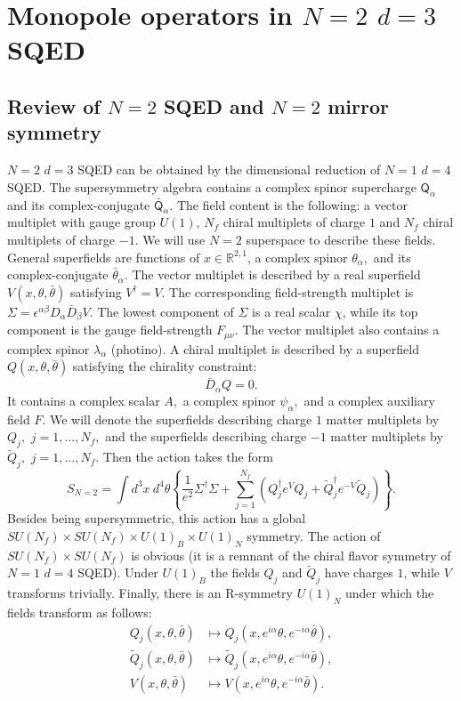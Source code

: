 \documentclass[a4paper,12pt, amsfonts, amssymb]{article}
\newcommand{\RR}{{\mathbb R}}
\newcommand{\eps}{\epsilon}
\newcommand{\tQ}{{\tilde Q}}
\newcommand{\bD}{{\bar D}}
\newcommand{\btheta}{{\bar \theta}}
\newcommand{\Q}{{\mathsf Q}}
\begin{document}
\section{Monopole operators in $N=2$ $d=3$ SQED}\label{sec:ntwo}

\subsection{Review of $N=2$ SQED and $N=2$ mirror symmetry}

$N=2$ $d=3$ SQED can be obtained by the dimensional reduction of $N=1$ $d=4$
SQED. The supersymmetry algebra contains a complex spinor supercharge $\Q_\alpha$ and its complex-conjugate $\bar{\Q}_\alpha$.
The field content is the following: a vector multiplet with gauge
group $U(1)$, $N_f$ chiral multiplets of charge $1$ and $N_f$ chiral multiplets
of charge $-1$. We will use $N=2$ superspace to describe these fields.
General superfields are functions of $x\in\RR^{2,1}$, a complex spinor 
$\theta_\alpha,$ and its complex-conjugate $\btheta_\alpha$. 
The vector multiplet is described
by a real superfield $V(x,\theta,\btheta)$ satisfying $V^\dag=V$. 
The corresponding field-strength multiplet is 
$\Sigma=\eps^{\alpha\beta}D_\alpha \bD_\beta V.$ The lowest component of
$\Sigma$ is a real scalar $\chi$, while its top component is the gauge 
field-strength $F_{\mu\nu}$.
The vector multiplet also contains a complex spinor $\lambda_\alpha$ (photino).
A chiral multiplet is described by a superfield $Q(x,\theta,\btheta)$ 
satisfying the chirality constraint:
$$
\bD_\alpha Q=0.
$$
It contains a complex scalar $A,$ a complex spinor $\psi_\alpha,$ and a
complex auxiliary field $F$.
We will denote the superfields describing charge $1$ matter multiplets 
by $Q_j,$ $j=1,\ldots,N_f,$ and the superfields describing charge $-1$ matter multiplets by $\tQ_j,$ $j=1,\ldots,N_f.$ Then the action takes the
form
$$
S_{N=2}=\int d^3 x\ d^4\theta\left\{\frac{1}{e^2}\Sigma^\dag\Sigma+
\sum_{j=1}^{N_f}\left(Q_j^\dag e^V Q_j+\tQ_j^\dag e^{-V} \tQ_j \right)\right\}.
$$
Besides being supersymmetric, this action has a global $SU(N_f)\times
SU(N_f)\times U(1)_B\times U(1)_N$ symmetry. 
The action of $SU(N_f)\times SU(N_f)$ is obvious (it is a remnant of the chiral flavor symmetry of $N=1$ $d=4$ SQED). Under $U(1)_B$ the fields $Q_j$ and
$\tQ_j$ have charges $1$, while $V$ transforms trivially. Finally, there is an R-symmetry $U(1)_N$ under which the fields transform as follows:
\begin{align*}
Q_j(x,\theta,\btheta)&\mapsto 
Q_j\left(x,e^{i\alpha}\theta,e^{-i\alpha}\btheta\right),\\
\tQ_j(x,\theta,\btheta)&\mapsto 
\tQ_j\left(x,e^{i\alpha}\theta,e^{-i\alpha}\btheta\right),\\
V(x,\theta,\btheta)&\mapsto 
V\left(x,e^{i\alpha}\theta,e^{-i\alpha}\btheta\right).
\end{align*}
\end{document}
